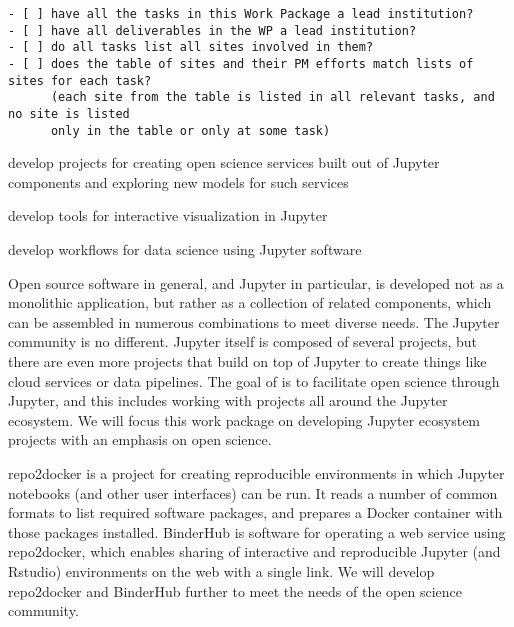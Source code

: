 \begin{draft}
\begin{verbatim}
- [ ] have all the tasks in this Work Package a lead institution?
- [ ] have all deliverables in the WP a lead institution?
- [ ] do all tasks list all sites involved in them?
- [ ] does the table of sites and their PM efforts match lists of sites for each task?
      (each site from the table is listed in all relevant tasks, and no site is listed
      only in the table or only at some task)
\end{verbatim}
\end{draft}

\begin{workpackage}[id=ecosystem,wphases=0-48,swsites,
  title=Developing the Jupyter Ecosystem,
  short=Ecosystem,
  lead=QS,
  SRLRM=30,
  UPSUDRM=4,
  QSRM=24,
  XFELRM=54
]
\begin{wpobjectives}
 \begin{compactitem}
   \item develop projects for creating open science services built out of Jupyter components and exploring new models for such services
   \item develop tools for interactive visualization in Jupyter
   \item develop workflows for data science using Jupyter software
 \end{compactitem}
\end{wpobjectives}

\begin{wpdescription}

Open source software in general, and Jupyter in particular,
is developed not as a monolithic application,
but rather as a collection of related components,
which can be assembled in numerous combinations to meet diverse needs.
The Jupyter community is no different.
Jupyter itself is composed of several projects,
but there are even more projects that build on top of Jupyter to create
things like cloud services or data pipelines.
The goal of \TheProject is to facilitate open science through Jupyter,
and this includes working with projects all around the Jupyter ecosystem.
We will focus this work package on developing
Jupyter ecosystem projects with an emphasis on open science.

repo2docker is a project for creating
reproducible environments in which Jupyter notebooks (and other user interfaces) can be run.
It reads a number of common formats to list required software packages,
and prepares a Docker container with those packages installed.
BinderHub is software for operating a web service using repo2docker,
which enables sharing of interactive and reproducible Jupyter (and Rstudio) environments on the web with a single link.
We will develop repo2docker and BinderHub further to meet the needs of the open science community.


\end{wpdescription}
\end{workpackage}
